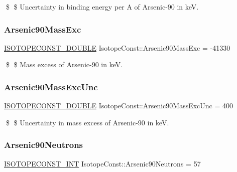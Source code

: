 \$ \$ Uncertainty in binding energy per A of Arsenic-\/90 in keV. \mbox{\label{group___isotope_const-_arsenic-_as90_ga244a76ddfddede8a103f9568e44e1477}} 
\subsubsection{\texorpdfstring{Arsenic90\+Mass\+Exc}{Arsenic90MassExc}}
{\footnotesize\ttfamily \mbox{\hyperlink{group___isotope_const-_macros_ga8f45a7272ce02c0b4c65c44636ed719a}{I\+S\+O\+T\+O\+P\+E\+C\+O\+N\+S\+T\+\_\+\+D\+O\+U\+B\+LE}} Isotope\+Const\+::\+Arsenic90\+Mass\+Exc = -\/41330}

\$ \$ Mass excess of Arsenic-\/90 in keV. \mbox{\label{group___isotope_const-_arsenic-_as90_gaee6644d4121248728e51b264a8fe56c3}} 
\subsubsection{\texorpdfstring{Arsenic90\+Mass\+Exc\+Unc}{Arsenic90MassExcUnc}}
{\footnotesize\ttfamily \mbox{\hyperlink{group___isotope_const-_macros_ga8f45a7272ce02c0b4c65c44636ed719a}{I\+S\+O\+T\+O\+P\+E\+C\+O\+N\+S\+T\+\_\+\+D\+O\+U\+B\+LE}} Isotope\+Const\+::\+Arsenic90\+Mass\+Exc\+Unc = 400}

\$ \$ Uncertainty in mass excess of Arsenic-\/90 in keV. \mbox{\label{group___isotope_const-_arsenic-_as90_gae78c9eb910d5f22149c9bced702c60bf}} 
\subsubsection{\texorpdfstring{Arsenic90\+Neutrons}{Arsenic90Neutrons}}
{\footnotesize\ttfamily \mbox{\hyperlink{group___isotope_const-_macros_ga5f18360b3e99483a35c32d789e62621c}{I\+S\+O\+T\+O\+P\+E\+C\+O\+N\+S\+T\+\_\+\+I\+NT}} Isotope\+Const\+::\+Arsenic90\+Neutrons = 57}

